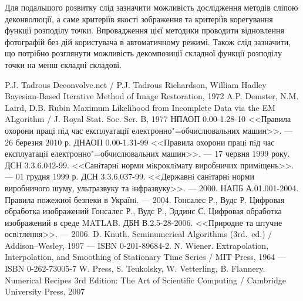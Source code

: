 \documentclass{diploma}
\begin{document}
  Для подальшого розвитку слід зазначити можливість дослідження методів сліпою
  деконволюції, а саме критеріїв якості зображення та критеріїв корегування
  функції розподілу точки.
  Впровадження цієї методики проводити відновлення фотографій без дій
  користувача в автоматичному режимі.
  Також слід зазначити, що потрібно розглянути можливість декомпозиції
  складної функції розподілу точки на менш складні складові.
  \clearpage
\begin{thebibliography}
   P.J. Tadrous Deconvolve.net / P.J. Tadrous
   Richardson, William Hadley Bayesian-Based
    Iterative Method of Image Restoration, 1972
   A.P. Demster, N.M. Laird, D.B. Rubin Maximum Likelihood from
    Incomplete Data via the EM ALgorithm / J. Royal Stat. Soc. Ser. B, 1977
   НПАОП 0.00-1.28-10 <<Правила охорони працi пiд час
    експлуатацiї електронно"=обчислювальних машин>>. --- 26 березня 2010 р.
   ДНАОП 0.00-1.31-99 <<Правила охорони працi пiд час
    експлуатацiї електронно"=обчислювальних машин>>. --- 17 червня 1999 року.
   ДСН 3.3.6.042-99. <<Санiтарнi норми мiкроклiмату виробничих
    примiщень>>. --- 01 грудня 1999 р.
   ДСН 3.3.6.037-99. <<Державнi санiтарнi норми виробничого
    шуму, ультразвуку та iнфразвуку>>. --- 2000.
   НАПБ А.01.001-2004. Правила пожежної безпеки в Українi. ---
    2004.
   Гонсалес Р., Вудс Р. Цифровая обработка изображений
   Гонсалес Р., Вудс Р., Эддинс С. Цифровая
  обработка изображений в среде MATLAB.
   ДБН В.2.5-28-2006. <<Природне та штучне освiтлення>>. ---
  2006.
   D. Knuth. Seminumerical Algorithms (3rd.\ ed.) /
  Addison–Wesley, 1997 --- ISBN 0-201-89684-2.
   N. Wiener. Extrapolation, Interpolation, and Smoothing of
  Stationary Time Series / MIT Press, 1964 --- ISBN 0-262-73005-7
   W. Press, S. Teukolsky, W. Vetterling, B. Flannery.
  Numerical Recipes 3rd Edition: The Art of Scientific Computing / Cambridge
  University Press, 2007


\end{thebibliography}
      
      \clearpage
      
      \clearpage
      
      \clearpage
{}
\lstset{language=C++}
  
      \clearpage
  
      \clearpage
% 
% 
\end{document}

